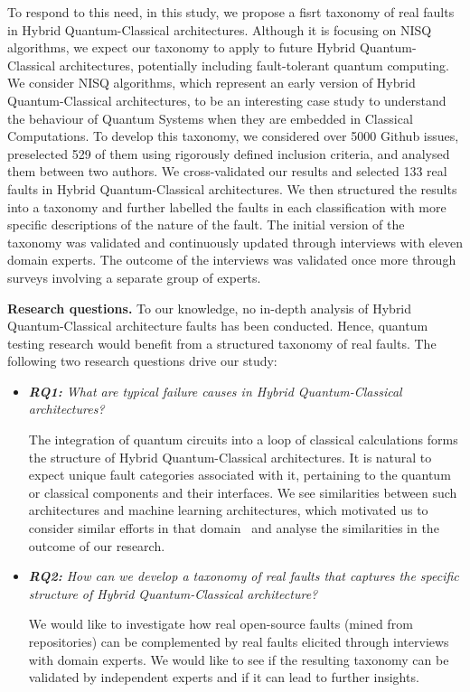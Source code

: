 To respond to this need, in this study, we propose a fisrt taxonomy of real faults in Hybrid Quantum-Classical architectures. Although it is focusing on NISQ algorithms, we expect our taxonomy to apply to future Hybrid Quantum-Classical architectures, potentially including fault-tolerant quantum computing. We consider NISQ algorithms, which represent an early version of Hybrid Quantum-Classical architectures, to be an interesting case study to understand the behaviour of Quantum Systems when they are embedded in Classical Computations.
To develop this taxonomy, we considered over 5000 Github issues, preselected 529 of them using rigorously defined inclusion criteria, and analysed them between two authors. We cross-validated our results and selected 133 real faults in Hybrid Quantum-Classical architectures.
 We then structured the results into a taxonomy and further labelled the faults in each classification with more specific descriptions of the nature of the fault. The initial version of the taxonomy was validated and continuously updated through interviews with eleven domain experts. The outcome of the interviews was validated once more through surveys involving a separate group of experts. 


\noindent \textbf{Research questions.}
 To our knowledge, no in-depth analysis of Hybrid Quantum-Classical architecture faults has been conducted. Hence, quantum testing research would benefit from a structured taxonomy of real faults. The following two research questions drive our study: 

\begin{itemize}\itemsep0em
\item  \textit{\textbf{RQ1:} What are typical failure causes in Hybrid Quantum-Classical architectures?} 

The integration of quantum circuits into a loop of classical calculations forms the structure of Hybrid Quantum-Classical architectures. It is natural to expect unique fault categories associated with it, pertaining to the quantum or classical components and their interfaces. We see similarities between such architectures and machine learning architectures, which motivated us to consider similar efforts in that domain~\cite{humbatova_taxonomy_2019} and analyse the similarities in the outcome of our research.  

\item  \textit{\textbf{RQ2: } How can we develop a taxonomy of real faults that captures the specific structure of Hybrid Quantum-Classical architecture?} 

We would like to investigate how real open-source faults (mined from repositories) can be complemented by real faults elicited through interviews with domain experts. We would like to see if the resulting taxonomy can be validated by independent experts and if it can lead to further insights. 

\end{itemize}

